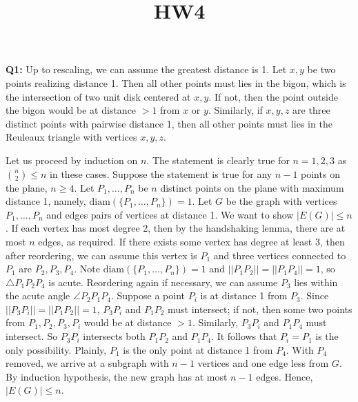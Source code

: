 \documentclass[12pt,reqno]{amsart}
\theoremstyle{definition}
\newcommand{\diam}[1]{\mathrm{diam}(#1)}
\begin{document}
\title{HW4}

\noindent \textbf{Q1:} Up to rescaling, we can assume the greatest distance is 1. Let $x,y$ be two points realizing distance 1. Then all other points must lies in the bigon, which is the intersection of two unit disk centered at $x,y$. If not, then the point outside the bigon would be at distance $>1$ from $x$ or $y$. Similarly,  if $x,y,z$ are three distinct points with pairwise distance 1, then all other points must lies in the Reuleaux triangle with vertices $x,y,z$.

\begin{center}
\end{center}


Let us proceed by induction on $n$. The statement is clearly true for $n=1,2,3$ as $\binom{n}{2}\leq n$ in these cases. Suppose the statement is true for any $n-1$ points on the plane, $n\geq 4$. Let $P_1,\dots, P_n$ be $n$ distinct points on the plane with maximum distance 1, namely,  $\diam{\{P_1,\dots,P_n\}}=1$. Let $G$ be the graph with vertices  $P_1,\dots, P_n$ and  edges  pairs of vertices at distance 1. We want to show $|E(G)|\leq n$. If each vertex has most degree 2, then by the handshaking lemma, there are at most $n$ edges, as required. If there exists some vertex has degree at least 3, then after reordering, we can assume this vertex is $P_1$ and three vertices connected to $P_1$ are $P_2,P_3,P_4$. Note $\diam{\{P_1,\dots,P_n\}}=1$ and $||P_1P_2||=||P_1P_4||=1$, so $\triangle P_1P_2P_4$ is acute. Reordering again if necessary, we can assume $P_3$ lies within the acute angle  $\angle P_2P_1P_4$. Suppose a point $P_i$ is at distance 1 from $P_3$. Since $||P_3P_i||=||P_1P_2||=1$, $P_3P_i$ and $P_1P_2$ must intersect; if not, then some two points from $P_1,P_2,P_3,P_i$ would be at distance $>1$. Similarly, $P_3P_i$ and $P_1P_4$ must intersect. So $P_3P_i$ intersects both $P_1P_2$ and $P_1P_4$. It follows that $P_i=P_1$ is the only possibility. Plainly, $P_1$ is the only point at distance 1 from $P_4$. With $P_4$ removed, we arrive at a subgraph with $n-1$ vertices and one edge less from $G$. By induction hypothesis, the new graph has at most $n-1$ edges. Hence, $|E(G)|\leq n$.
\end{document}
